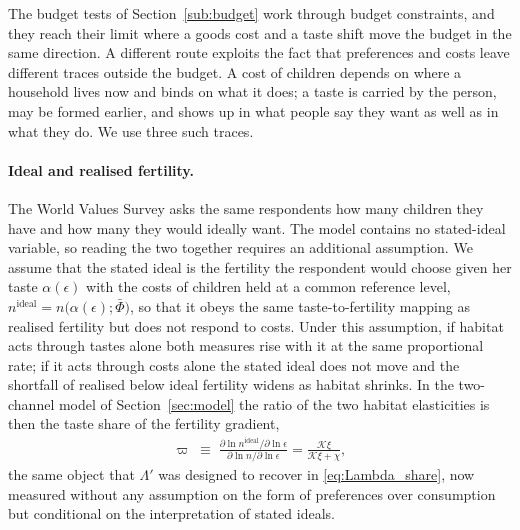\documentclass[11pt]{article}
\begin{document}
The budget tests of Section~\ref{sub:budget} work through budget constraints, and they reach their limit
where a goods cost and a taste shift move the budget in the same direction. A different route
exploits the fact that preferences and costs leave different traces outside the budget. A cost of
children depends on where a household lives now and binds on what it does; a taste is carried by
the person, may be formed earlier, and shows up in what people say they want as well as in what
they do. We use three such traces.

\paragraph{Ideal and realised fertility.}
The World Values Survey asks the same respondents how many children they have and how many they
would ideally want. The model contains no stated-ideal variable, so reading the two together requires
an additional assumption. We assume that the stated ideal is the fertility the respondent would choose
given her taste $\alpha(\epsilon)$ with the costs of children held at a common reference level,
$n^{\text{ideal}}=n\big(\alpha(\epsilon);\bar\Phi\big)$, so that it obeys the same taste-to-fertility
mapping as realised fertility but does not respond to costs. Under this assumption, if habitat acts
through tastes alone both measures rise with it at the same proportional rate; if it acts through costs
alone the stated ideal does not move and the shortfall of realised below ideal fertility widens as
habitat shrinks. In the two-channel model of Section~\ref{sec:model} the ratio of the two habitat
elasticities is then the taste share of the fertility gradient,
\begin{align}
\varpi\;\equiv\;\frac{\partial\ln n^{\text{ideal}}/\partial\ln\epsilon}{\partial\ln n/\partial\ln\epsilon}
=\frac{\mathcal{K}\xi}{\mathcal{K}\xi+\chi},
\label{eq:tau}
\end{align}
the same object that $\Lambda'$ was designed to recover in \eqref{eq:Lambda_share}, now measured
without any assumption on the form of preferences over consumption but conditional on the
interpretation of stated ideals.
\end{document}

